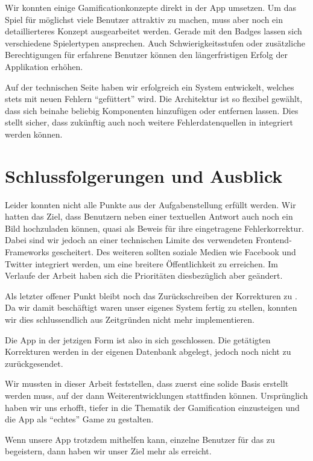 Wir konnten einige Gamificationkonzepte direkt in der App umsetzen.
Um das Spiel für möglichst viele Benutzer attraktiv zu machen, muss aber noch ein detaillierteres Konzept ausgearbeitet werden.
Gerade mit den Badges lassen sich verschiedene Spielertypen ansprechen.
Auch Schwierigkeitsstufen oder zusätzliche Berechtigungen für erfahrene Benutzer können den längerfristigen Erfolg der Applikation erhöhen.

Auf der technischen Seite haben wir erfolgreich ein System entwickelt, welches stets mit neuen Fehlern "`gefüttert"' wird.
Die Architektur ist so flexibel gewählt, dass sich beinahe beliebig Komponenten hinzufügen oder entfernen lassen.
Dies stellt sicher, dass zukünftig auch noch weitere Fehlerdatenquellen in \kort{} integriert werden können.

\section{Schlussfolgerungen und Ausblick}
Leider konnten nicht alle Punkte aus der Aufgabenstellung erfüllt werden.
Wir hatten das Ziel, dass Benutzern neben einer textuellen Antwort auch noch ein Bild hochzuladen können, quasi als Beweis für ihre eingetragene Fehlerkorrektur.
Dabei sind wir jedoch an einer technischen Limite des verwendeten Frontend-Frameworks  gescheitert.
Des weiteren sollten soziale Medien wie Facebook und Twitter integriert werden, um eine breitere Öffentlichkeit zu erreichen.
Im Verlaufe der Arbeit haben sich die Prioritäten diesbezüglich aber geändert.

Als letzter offener Punkt bleibt noch das Zurückschreiben der Korrekturen zu .
Da wir damit beschäftigt waren unser eigenes System fertig zu stellen, konnten wir dies schlussendlich aus Zeitgründen nicht mehr implementieren.

Die App in der jetzigen Form ist also in sich geschlossen. Die getätigten Korrekturen werden in der eigenen Datenbank abgelegt, jedoch noch nicht zu  zurückgesendet.

Wir mussten in dieser Arbeit feststellen, dass zuerst eine solide Basis erstellt werden muss, auf der dann Weiterentwicklungen stattfinden können.
Ursprünglich haben wir uns erhofft, tiefer in die Thematik der \gls{Gamification} einzusteigen und die App als "`echtes"' Game zu gestalten.

Wenn unsere App trotzdem mithelfen kann, einzelne Benutzer für das  zu begeistern, dann haben wir unser  Ziel mehr als erreicht.